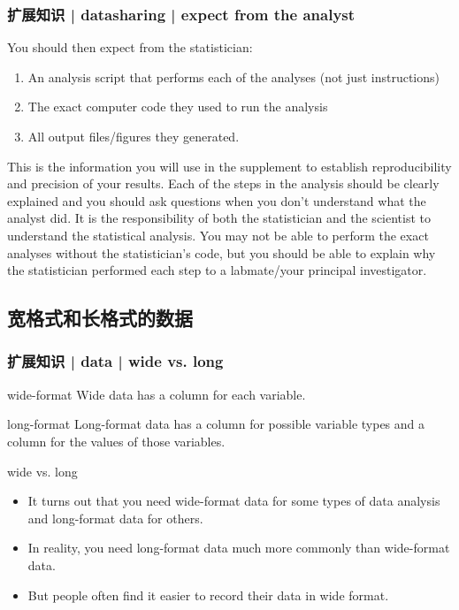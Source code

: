 \begin{frame}
  \frametitle{扩展知识 | datasharing | expect from the analyst}
  You should then expect from the statistician:
  \begin{enumerate}
    \item An analysis script that performs each of the analyses (not just instructions)
    \item The exact computer code they used to run the analysis
    \item All output files/figures they generated.
  \end{enumerate}
  This is the information you will use in the supplement to establish reproducibility and precision of your results. Each of the steps in the analysis should be clearly explained and you should ask questions when you don't understand what the analyst did. It is the responsibility of both the statistician and the scientist to understand the statistical analysis. You may not be able to perform the exact analyses without the statistician's code, but you should be able to explain why the statistician performed each step to a labmate/your principal investigator. 
\end{frame}

\subsection{宽格式和长格式的数据}
\begin{frame}
  \frametitle{扩展知识 | data | wide vs. long}
  \begin{block}{wide-format}
  Wide data has a column for each variable.
  \end{block}
  \pause
  \begin{block}{long-format}
  Long-format data has a column for possible variable types and a column for the values of those variables. 
  \end{block}
  \pause
  \begin{block}{wide vs. long}
    \begin{itemize}
      \item It turns out that you need wide-format data for some types of data analysis and long-format data for others.
      \item In reality, you need long-format data much more commonly than wide-format data.
      \item But people often find it easier to record their data in wide format.
    \end{itemize}
  \end{block}
\end{frame}

